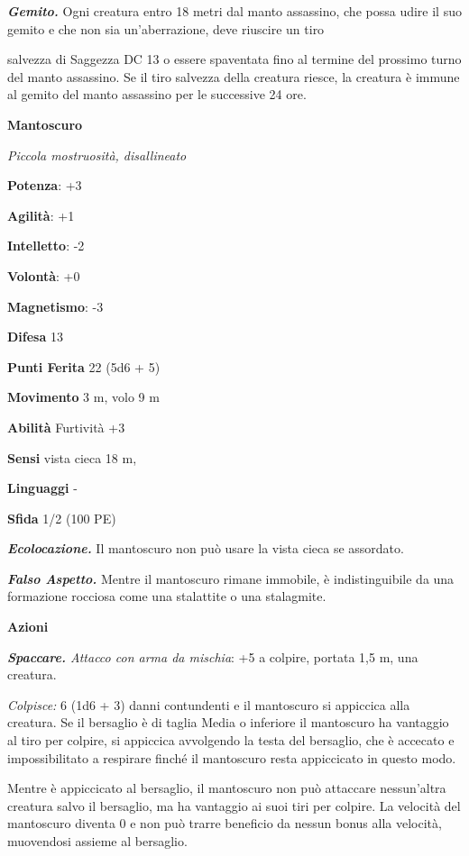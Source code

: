 \begin{multicols}{2}
\emph{\textbf{Gemito.}} Ogni creatura entro 18 metri dal manto
assassino, che possa udire il suo gemito e che non sia un'aberrazione,
deve riuscire un tiro


salvezza di Saggezza DC 13 o essere spaventata fino al termine del
prossimo turno del manto assassino. Se il tiro salvezza della creatura
riesce, la creatura è immune al gemito del manto assassino per le
successive 24 ore.



\textbf{Mantoscuro}

\emph{Piccola mostruosità, disallineato}

\textbf{Potenza}: +3

\textbf{Agilità}: +1

\textbf{Intelletto}: -2

\textbf{Volontà}: +0

\textbf{Magnetismo}: -3

\textbf{Difesa} 13

\textbf{Punti Ferita} 22 (5d6 + 5)

\textbf{Movimento} 3 m, volo 9 m

\textbf{Abilità} Furtività +3

\textbf{Sensi} vista cieca 18 m, 

\textbf{Linguaggi} -

\textbf{Sfida} 1/2 (100 PE)

\emph{\textbf{Ecolocazione.}} Il mantoscuro non può usare la vista cieca
se assordato.

\emph{\textbf{Falso Aspetto.}} Mentre il mantoscuro rimane immobile, è
indistinguibile da una formazione rocciosa come una stalattite o una
stalagmite.

\textbf{Azioni}

\emph{\textbf{Spaccare.} Attacco con arma da mischia}: +5 a colpire,
portata 1,5 m, una creatura.

\emph{Colpisce:} 6 (1d6 + 3) danni contundenti e il mantoscuro si
appiccica alla creatura. Se il bersaglio è di taglia Media o inferiore
il mantoscuro ha vantaggio al tiro per colpire, si appiccica avvolgendo
la testa del bersaglio, che è accecato e impossibilitato a respirare
finché il mantoscuro resta appiccicato in questo modo.

Mentre è appiccicato al bersaglio, il mantoscuro non può attaccare
nessun'altra creatura salvo il bersaglio, ma ha vantaggio ai suoi tiri
per colpire. La velocità del mantoscuro diventa 0 e non può trarre
beneficio da nessun bonus alla velocità, muovendosi assieme al
bersaglio.


\end{multicols}
